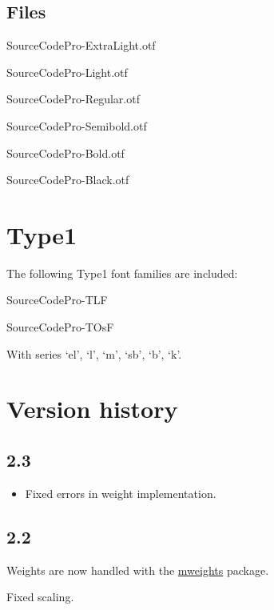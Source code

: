 \documentclass[11pt,a4paper,english]{article}
\begin{document}
\begin{multicols}{2}
\subsection{Files}
\begin{itemize*}
	\item SourceCodePro-ExtraLight.otf
	\item SourceCodePro-Light.otf
	\item SourceCodePro-Regular.otf
	\item SourceCodePro-Semibold.otf
	\item SourceCodePro-Bold.otf
	\item SourceCodePro-Black.otf
\end{itemize*}

\section{Type1}
The following Type1 font families are included:
\begin{itemize*}
	\item SourceCodePro-TLF
	\item SourceCodePro-TOsF
\end{itemize*}
With series ‘el’, ‘l’, ‘m’, ‘sb’, ‘b’, ‘k’.%

\section{Version history}
\subsection*{2.3}
\begin{itemize}
	\item Fixed errors in weight implementation.
\end{itemize}

\subsection*{2.2}
\begin{itemize*}
	\item Weights are now handled with the \href{http://www.ctan.org/pkg/mweights}{mweights} package.
	\item Fixed scaling.
\end{itemize*}


\end{multicols}
\end{document}
